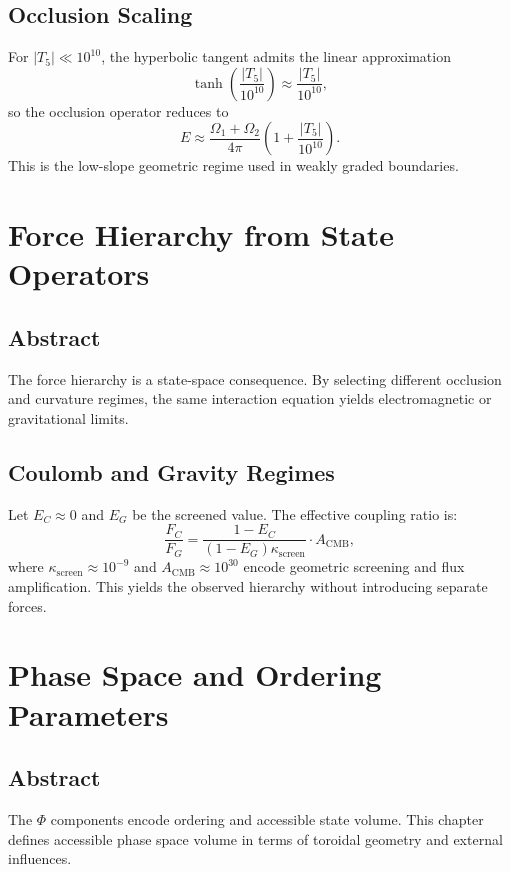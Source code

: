 \documentclass[12pt]{book}
\begin{document}
\section{Occlusion Scaling}
For $|T_5| \ll 10^{10}$, the hyperbolic tangent admits the linear approximation
\begin{equation}
\tanh\left(\frac{|T_5|}{10^{10}}\right) \approx \frac{|T_5|}{10^{10}},
\end{equation}
so the occlusion operator reduces to
\begin{equation}
E \approx \frac{\Omega_1 + \Omega_2}{4\pi}\left(1 + \frac{|T_5|}{10^{10}}\right).
\end{equation}
This is the low-slope geometric regime used in weakly graded boundaries.

\chapter{Force Hierarchy from State Operators}

\section*{Abstract}
The force hierarchy is a state-space consequence. By selecting different occlusion and curvature regimes,
the same interaction equation yields electromagnetic or gravitational limits.

\section{Coulomb and Gravity Regimes}
Let $E_C \approx 0$ and $E_G$ be the screened value. The effective coupling ratio is:
\begin{equation}
\frac{F_C}{F_G} = \frac{1 - E_C}{(1 - E_G)\kappa_{\text{screen}}}\cdot A_{\text{CMB}},
\end{equation}
where $\kappa_{\text{screen}} \approx 10^{-9}$ and $A_{\text{CMB}} \approx 10^{30}$ encode geometric screening
and flux amplification. This yields the observed hierarchy without introducing separate forces.

\chapter{Phase Space and Ordering Parameters}

\section*{Abstract}
The $\Phi$ components encode ordering and accessible state volume. This chapter defines accessible phase
space volume in terms of toroidal geometry and external influences.
\end{document}
